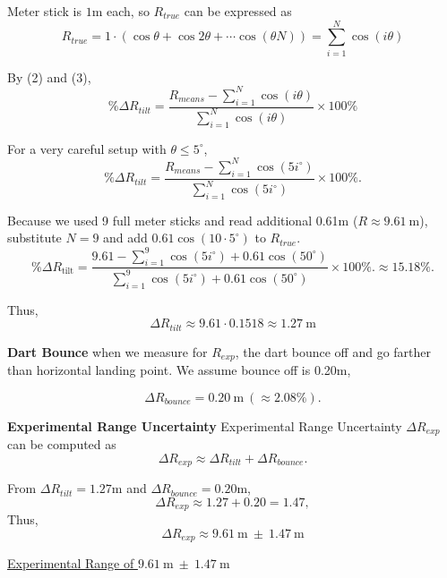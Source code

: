 \documentclass[12pt]{article}
\begin{document}
Meter stick is $1\mathrm{m}$ each, so $R_{true}$ can be expressed as
\[
R_{true}=1\cdot(\cos \theta+\cos 2\theta+\cdots \cos (\theta N))=\sum_{i=1}^{N} \cos\!\left(i\theta\right)
\tag{3}
\]

By (2) and (3),
\[
\%\Delta R_{tilt} = \frac{R_{means}-\sum_{i=1}^{N} \cos\!\left(i\theta\right)}{\sum_{i=1}^{N} \cos\!\left(i\theta\right)}\times 100\%
\]
\vspace{1em}

For a very careful setup with $\theta\le 5^\circ$,
\[
\%\Delta R_{tilt} = 
\frac{R_{means}-\sum_{i=1}^{N} \cos\!\left(5i^{\circ}\right)}{\sum_{i=1}^{N} \cos\!\left(5i^{\circ}\right)}\times 100\%.
\]
\vspace{1em}

Because we used 9 full meter sticks and read additional 0.61m ($R\approx 9.61~\mathrm{m}$), substitute $N=9$ and add $0.61\cos(10\cdot5^{\circ})$ to $R_{true}$.
\vspace{1em}
\[
\%\Delta R_{\text{tilt}} 
=
\frac{9.61-\sum_{i=1}^{9} \cos\!\left(5i^{\circ}\right)+0.61\cos(50^{\circ})}{\sum_{i=1}^{9} \cos\!\left(5i^{\circ}\right)+0.61\cos(50^{\circ})}\times 100\%.
\approx\boxed{15.18\%}.
\]
\vspace{1em}

Thus,
\[
\Delta R_{tilt} \approx 9.61 \cdot 0.1518 \approx 1.27 \ \mathrm{m} 
\]

\vspace{1em}

\textbf{Dart Bounce} when we measure for $R_{exp}$, the dart bounce off and go farther than horizontal landing point. We assume bounce off is 0.20m,

\[
\Delta R_{bounce}=0.20~\mathrm{m} \ (\approx2.08\%).
\]

\vspace{1em}

\textbf{Experimental Range Uncertainty}
Experimental Range Uncertainty $\Delta R_{exp}$ can be computed as
\vspace{1em}
\[
\Delta R_{exp} \approx \Delta R_{tilt} + \Delta R_{bounce}.
\]

\vspace{1em}
From $\Delta R_{tilt}=1.27\mathrm{m}$ and $\Delta R_{bounce}=0.20\mathrm{m}$,
\[
\Delta R_{exp} \approx 1.27 + 0.20 = 1.47,
\]
Thus,
\[
\Delta R_{exp} \approx {9.61~\mathrm{m}~\pm~1.47~\mathrm{m}}
\]

\vspace{1em}

\noindent\hfill\underline{
Experimental Range of $9.61~\mathrm{m} \ \pm\ 1.47~\mathrm{m}\quad\text{}$
}
\end{document}
